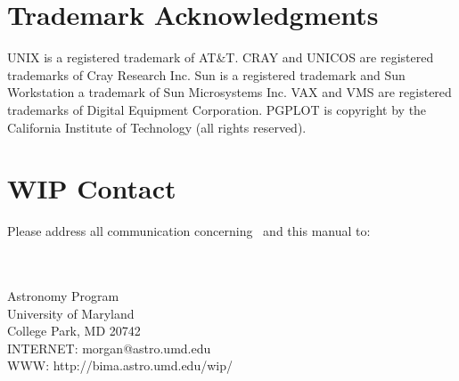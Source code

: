 \section*{Trademark Acknowledgments}

UNIX is a registered trademark of AT\&T.
CRAY and UNICOS are registered trademarks of Cray Research Inc.
Sun is a registered trademark and Sun Workstation a trademark of Sun
Microsystems Inc.
VAX and VMS are registered trademarks of Digital Equipment Corporation.
PGPLOT is copyright by the California Institute of Technology (all
rights reserved).

\section*{WIP Contact}

Please address all communication concerning \wip\ and this manual to: \\
\begin{flushleft}
\\
\\
Astronomy Program \\
University of Maryland \\
College Park, MD  20742 \\
INTERNET:  morgan@astro.umd.edu \\
WWW:  http://bima.astro.umd.edu/wip/
\end{flushleft}
